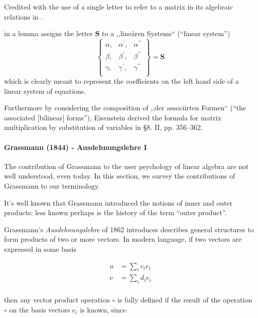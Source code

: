 Credited with the use of a single letter to refer to a matrix in its algebraic relations in \cite{Dorier1995}.

\cite[p. 327]{Eisenstein1844} in a lemma assigns the letter $\boldsymbol S$ to a ,,lineären Systems``
(``linear system'')
\[
\begin{Bmatrix}
\alpha, & \alpha^\prime, & \alpha^{\prime\prime} \\
\beta, & \beta^\prime, & \beta^{\prime\prime} \\
\gamma, & \gamma^\prime, & \gamma^{\prime\prime} \\
\end{Bmatrix} = \boldsymbol S
\]
which is clearly meant to represent the coefficients on the left hand side of a
linear system of equations.

Furthermore by considering the composition of  ,,der associirten Formen`` (``the associated [bilinear] forms''),
Eisenstein derived the formula for matrix multiplication by substitution of variables
in \S 8. II, pp. 356--362.


\paragraph{Grassmann (1844) - Ausdehnungslehre I~\cite{Grassmann1844,Grassmann1995}}

The contribution of Grassmann to the user psychology of linear algebra are not well understood, even today. In this section, we survey the contributions of Grassmann to our terminology.

It's well known that Grassmann introduced the notions of inner and outer products; less known perhaps is the history of the term ``outer product''.



Grassmann's \textit{Ausdehnungslehre} of 1862\cite[Ch. 2]{Grassmann1862} introduces describes general structures to form products of two or more vectors. In modern language, if two vectors are expressed in some basis

\begin{align}
u & = \sum_i c_i e_i \\
v & = \sum_i d_i e_i \\
\end{align}

then any vector product operation $\circ$ is fully defined if the result of the operation $\circ$ on the basis vectors $e_i$ is known, since

